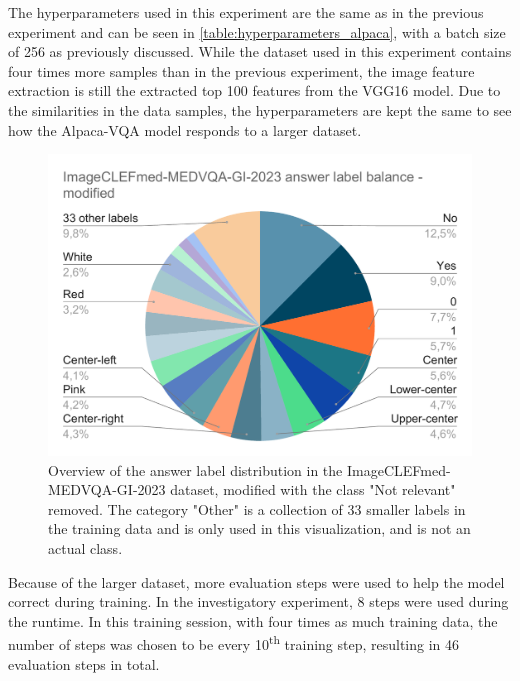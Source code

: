     The hyperparameters used in this experiment are the same as in the previous experiment and can be seen in \autoref{table:hyperparameters_alpaca}, with a batch size of 256 as previously discussed. While the dataset used in this experiment contains four times more samples than in the previous experiment, the image feature extraction is still the extracted top 100 features from the VGG16 model. 
    Due to the similarities in the data samples, the hyperparameters are kept the same to see how the Alpaca-VQA model responds to a larger dataset.
    
    
    \begin{figure}[htb]
        \centerline{
        \includegraphics[width=1.08\textwidth]{images/ImageCLEFmed-MEDVQA-GI-2023-answer-label-balance-modified.pdf}}
        \caption{Overview of the answer label distribution in the ImageCLEFmed-MEDVQA-GI-2023 dataset, modified with the class "Not relevant" removed. The category "Other" is a collection of 33 smaller labels in the training data and is only used in this visualization, and is not an actual class.}
        \label{fig:ImageCLEFmed-MEDVQA-GI-2023_answer_label_balance-modified}
    \end{figure} 

    Because of the larger dataset, more evaluation steps were used to help the model correct during training. In the investigatory experiment, 8 steps were used during the runtime. In this training session, with four times as much training data, the number of steps was chosen to be every 10\textsuperscript{th} training step, resulting in 46 evaluation steps in total. 

